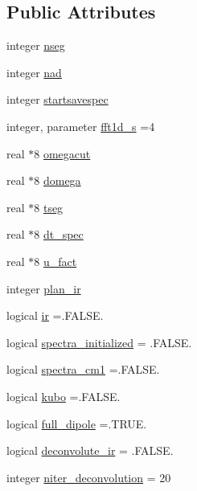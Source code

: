 \subsection*{Public Attributes}
\begin{DoxyCompactItemize}
\item 
integer \hyperlink{classspectra_ac0e35bcddedb3fbda30b8a359da97b94}{nseg}
\item 
integer \hyperlink{classspectra_a45c919da29d33cfaf80a704aa631b346}{nad}
\item 
integer \hyperlink{classspectra_abfab3c8bd49f7558f03c92c031b7721a}{startsavespec}
\item 
integer, parameter \hyperlink{classspectra_ac089e26587f369f12bc46f1c90f87f3a}{fft1d\-\_\-s} =4
\item 
real $\ast$8 \hyperlink{classspectra_a464f70f16d24c366c5421572d902496f}{omegacut}
\item 
real $\ast$8 \hyperlink{classspectra_a0e698cb9fa5f3ddcccaf55304c393c33}{domega}
\item 
real $\ast$8 \hyperlink{classspectra_a1cd3434363a2e5083b4366b0295dd6b4}{tseg}
\item 
real $\ast$8 \hyperlink{classspectra_aca97470f841ed23ff62294903133449f}{dt\-\_\-spec}
\item 
real $\ast$8 \hyperlink{classspectra_a569f0a00a8335165b556f9d9a2199e5c}{u\-\_\-fact}
\item 
integer \hyperlink{classspectra_a995a9e3efec5854dc763bccdc424d47e}{plan\-\_\-ir}
\item 
logical \hyperlink{classspectra_a5adb3da0fc3d13e07cc600138acab1a8}{ir} =.F\-A\-L\-S\-E.
\item 
logical \hyperlink{classspectra_a4f6272434253b12d66be37f65b81b054}{spectra\-\_\-initialized} = .F\-A\-L\-S\-E.
\item 
logical \hyperlink{classspectra_a4fa256bf10ebce828d63f4b324c55116}{spectra\-\_\-cm1} =.F\-A\-L\-S\-E.
\item 
logical \hyperlink{classspectra_a3f9dbddf10012921dcfcf5e327d305c2}{kubo} =.F\-A\-L\-S\-E.
\item 
logical \hyperlink{classspectra_a4212b9178886dd58ea98493c47fd2105}{full\-\_\-dipole} =.T\-R\-U\-E.
\item 
logical \hyperlink{classspectra_a2a068eb1a4906b0bc46cc04329cd5963}{deconvolute\-\_\-ir} = .F\-A\-L\-S\-E.
\item 
integer \hyperlink{classspectra_a1aee53bf91686489408eeb9419bc706e}{niter\-\_\-deconvolution} = 20
\item 

\end{DoxyCompactItemize}
